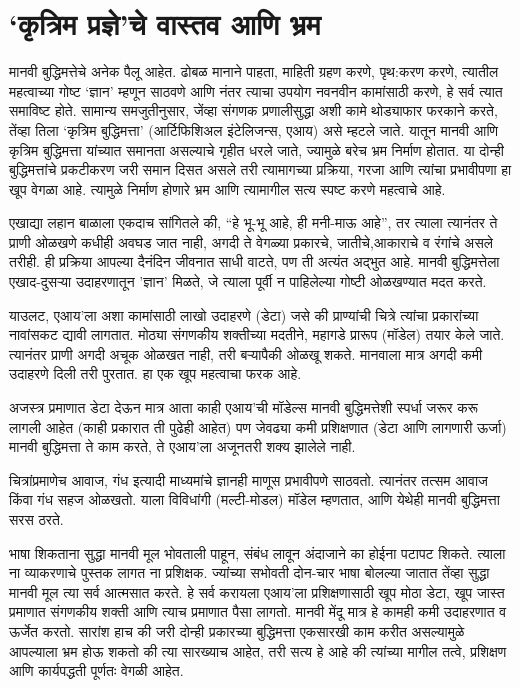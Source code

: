 \chapter{`कृत्रिम प्रज्ञे'चे वास्तव आणि भ्रम}

मानवी बुद्धिमत्तेचे अनेक पैलू आहेत. ढोबळ मानाने पाहता, माहिती ग्रहण करणे, पृथ:करण करणे, त्यातील महत्वाच्या गोष्ट `ज्ञान' म्हणून साठवणे आणि नंतर त्याचा उपयोग नवनवीन कामांसाठी करणे, हे सर्व त्यात समाविष्ट होते. सामान्य समजुतीनुसार, जेंव्हा संगणक प्रणालीसुद्धा अशी कामे थोड्याफार फरकाने करते, तेंव्हा तिला `कृत्रिम बुद्धिमत्ता' (आर्टिफिशिअल इंटेलिजन्स, एआय) असे म्हटले जाते. यातून मानवी आणि कृत्रिम बुद्धिमत्ता यांच्यात समानता असल्याचे गृहीत धरले जाते, ज्यामुळे बरेच भ्रम निर्माण होतात. या दोन्ही बुद्धिमत्तांचे प्रकटीकरण जरी समान दिसत असले तरी त्यामागच्या प्रक्रिया, गरजा आणि त्यांचा प्रभावीपणा हा खूप वेगळा आहे. त्यामुळे निर्माण होणारे भ्रम आणि त्यामागील सत्य स्पष्ट करणे महत्वाचे आहे.

एखाद्या लहान बाळाला एकदाच सांगितले की, ``हे भू-भू आहे, ही मनी-माऊ आहे'', तर त्याला त्यानंतर ते प्राणी ओळखणे कधीही अवघड जात नाही, अगदी ते वेगळ्या प्रकारचे, जातीचे,आकाराचे व रंगांचे असले तरीही. ही प्रक्रिया आपल्या दैनंदिन जीवनात साधी वाटते, पण ती अत्यंत अद्भुत आहे. मानवी बुद्धिमत्तेला एखाद-दुसऱ्या उदाहरणातून 'ज्ञान' मिळते, जे त्याला पूर्वी न पाहिलेल्या गोष्टी ओळखण्यात मदत करते.

याउलट, एआय'ला अशा कामांसाठी लाखो उदाहरणे (डेटा) जसे की प्राण्यांची चित्रे त्यांचा प्रकारांच्या नावांसकट द्यावी लागतात. मोठ्या संगणकीय शक्तीच्या मदतीने, महागडे प्रारूप (मॉडेल) तयार केले जाते. त्यानंतर प्राणी अगदी अचूक ओळखत नाही, तरी बऱ्यापैकी ओळखू शकते. मानवाला मात्र अगदी कमी उदाहरणे दिली तरी पुरतात. हा एक खूप महत्वाचा फरक आहे. 

अजस्त्र प्रमाणात डेटा देऊन मात्र आता काही एआय'ची मॉडेल्स मानवी बुद्धिमत्तेशी स्पर्धा जरूर करू लागली आहेत (काही प्रकारात ती पुढेही आहेत) पण जेवढ्या कमी प्रशिक्षणात (डेटा आणि लागणारी ऊर्जा) मानवी बुद्धिमत्ता ते काम करते, ते एआय'ला अजूनतरी शक्य झालेले नाही. 

चित्रांप्रमाणेच आवाज, गंध इत्यादी माध्यमांचे ज्ञानही माणूस प्रभावीपणे साठवतो. त्यानंतर तत्सम आवाज किंवा गंध सहज ओळखतो. याला विविधांगी (मल्टी-मोडल) मॉडेल म्हणतात, आणि येथेही मानवी बुद्धिमत्ता सरस ठरते.

भाषा शिकताना सुद्धा मानवी मूल भोवताली पाहून, संबंध लावून अंदाजाने का होईना पटापट शिकते. त्याला ना व्याकरणाचे पुस्तक लागत ना प्रशिक्षक. ज्यांच्या सभोवती दोन-चार भाषा बोलल्या जातात तेंव्हा सुद्धा मानवी मूल त्या सर्व आत्मसात करते. हे सर्व करायला एआय'ला प्रशिक्षणासाठी खूप मोठा डेटा, खूप जास्त प्रमाणात संगणकीय शक्ती आणि त्याच प्रमाणात पैसा लागतो. मानवी मेंदू मात्र हे कामही कमी उदाहरणात व ऊर्जेत करतो. सारांश हाच की  जरी दोन्ही प्रकारच्या बुद्धिमत्ता एकसारखी काम करीत असल्यामुळे आपल्याला भ्रम होऊ शकतो की त्या सारख्याच आहेत, तरी सत्य हे आहे की त्यांच्या मागील तत्वे, प्रशिक्षण आणि कार्यपद्धती पूर्णतः वेगळी आहेत. 

